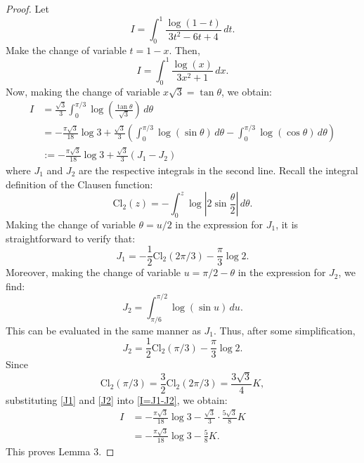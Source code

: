 \documentclass{amsart}
\numberwithin{equation}{section}
\begin{document}
\begin{proof}
    Let 
    \[I=\int_0^1\frac{\log(1-t)}{3t^2-6t+4}\,dt.\]
    Make the change of variable $t=1-x$. Then,
    \[I=\int_0^1\frac{\log(x)}{3x^2+1}\,dx.\]
    Now, making the change of variable $x\sqrt3=\tan\theta$, we obtain:
    \begin{align}
        I&=\frac{\sqrt3}{3}\int_0^{\pi/3}\log\left(\frac{\tan\theta}{\sqrt3}\right)\,d\theta\nonumber\\
        &=-\frac{\pi\sqrt{3}}{18}\log3+\frac{\sqrt3}{3}\left(\int_0^{\pi/3}\log\left(\sin\theta\right)\,d\theta-\int_0^{\pi/3}\log\left(\cos\theta\right)\,d\theta\right)\nonumber\\
        &:=-\frac{\pi\sqrt{3}}{18}\log3+\frac{\sqrt3}3(J_1-J_2)
        \label{I=J1-J2}
    \end{align}
    where $J_1$ and $J_2$ are the respective integrals in the second line. Recall the integral definition of the Clausen function:
    \[\text{Cl}_2(z)=-\int_0^z\log\left|2\sin\frac{\theta}{2}\right|\,d\theta.\]
    Making the change of variable $\theta=u/2$ in the expression for $J_1$, it is straightforward to verify that:
    \begin{equation}
        J_1=-\frac12\text{Cl}_2(2\pi/3)-\frac\pi3\log2.
    \label{J1}
    \end{equation}
    Moreover, making the change of variable $u=\pi/2-\theta$ in the expression for $J_2$, we find:
    \[J_2=\int_{\pi/6}^{\pi/2}\log{(\sin u)}\,du.\]
    This can be evaluated in the same manner as $J_1$. Thus, after some simplification,
    \begin{equation}
    J_2=\frac12\text{Cl}_2(\pi/3)-\frac\pi3\log2.
    \label{J2}
    \end{equation}
    Since \[\text{Cl}_2(\pi/3)=\frac32\text{Cl}_2(2\pi/3)=\frac{3\sqrt3}{4}K,\]
    substituting \eqref{J1} and \eqref{J2} into \eqref{I=J1-J2}, we obtain:
    \begin{align*}
        I&=-\frac{\pi\sqrt{3}}{18}\log3-\frac{\sqrt3}3\cdot\frac{5\sqrt3}{8}K\\&=-\frac{\pi\sqrt{3}}{18}\log3-\frac{5}{8}K.
    \end{align*}
    This proves Lemma 3.
\end{proof}

\end{document}
